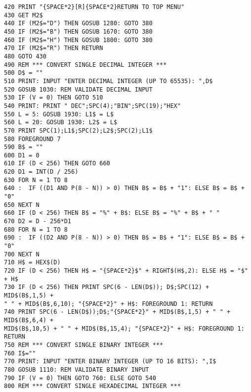 \begin{tcolorbox}[colback=black,coltext=white]
\verbatimfont{\codefont}
\begin{verbatim}
420 PRINT "{SPACE*2}[R]{SPACE*2}RETURN TO TOP MENU"
430 GET M2$
440 IF (M2$="D") THEN GOSUB 1280: GOTO 380
450 IF (M2$="B") THEN GOSUB 1670: GOTO 380
460 IF (M2$="H") THEN GOSUB 1800: GOTO 380
470 IF (M2$="R") THEN RETURN
480 GOTO 430
490 REM *** CONVERT SINGLE DECIMAL INTEGER ***
500 D$ = ""
510 PRINT: INPUT "ENTER DECIMAL INTEGER (UP TO 65535): ",D$
520 GOSUB 1030: REM VALIDATE DECIMAL INPUT
530 IF (V = 0) THEN GOTO 510
540 PRINT: PRINT " DEC";SPC(4);"BIN";SPC(19);"HEX"
550 L = 5: GOSUB 1930: L1$ = L$
560 L = 20: GOSUB 1930: L2$ = L$
570 PRINT SPC(1);L1$;SPC(2);L2$;SPC(2);L1$
580 FOREGROUND 7
590 B$ = ""
600 D1 = 0
610 IF (D < 256) THEN GOTO 660
620 D1 = INT(D / 256)
630 FOR N = 1 TO 8
640 :  IF ((D1 AND P(8 - N)) > 0) THEN B$ = B$ + "1": ELSE B$ = B$ + "0"
650 NEXT N
660 IF (D < 256) THEN B$ = "%
670 D2 = D - 256*D1
680 FOR N = 1 TO 8
690 :  IF ((D2 AND P(8 - N)) > 0) THEN B$ = B$ + "1": ELSE B$ = B$ + "0"
700 NEXT N
710 H$ = HEX$(D)
720 IF (D < 256) THEN H$ = "{SPACE*2}$" + RIGHT$(H$,2): ELSE H$ = "$" + H$
730 IF (D < 256) THEN PRINT SPC(6 - LEN(D$)); D$;SPC(12) + MID$(B$,1,5) +
" " + MID$(B$,6,10); "{SPACE*2}" + H$: FOREGROUND 1: RETURN
740 PRINT SPC(6 - LEN(D$));D$;"{SPACE*2}" + MID$(B$,1,5) + " " + MID$(B$,6,4) +
MID$(B$,10,5) + " " + MID$(B$,15,4); "{SPACE*2}" + H$: FOREGROUND 1: RETURN
750 REM *** CONVERT SINGLE BINARY INTEGER ***
760 I$=""
770 PRINT: INPUT "ENTER BINARY INTEGER (UP TO 16 BITS): ",I$
780 GOSUB 1110: REM VALIDATE BINARY INPUT
790 IF (V = 0) THEN GOTO 760: ELSE GOTO 540
800 REM *** CONVERT SINGLE HEXADECIMAL INTEGER ***
\end{verbatim}
\end{tcolorbox}
